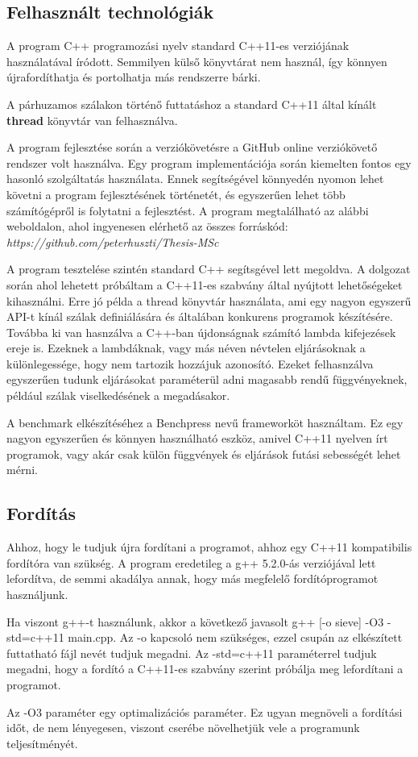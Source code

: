 \documentclass[twoside, a4paper, 12pt]{article}
\begin{document}
\subsection{Felhasznált technológiák}
A program C++ programozási nyelv standard C++11-es verziójának használatával íródott. Semmilyen külső könyvtárat nem használ, így könnyen újrafordíthatja és portolhatja más rendszerre bárki. \par
A párhuzamos szálakon történő futtatáshoz a standard C++11 által kínált \textbf{thread} könyvtár van felhasználva. \par
A program fejlesztése során a verziókövetésre a GitHub online verziókövető rendszer volt használva. Egy program implementációja során kiemelten fontos egy hasonló szolgáltatás használata. Ennek segítségével könnyedén nyomon lehet követni a program fejlesztésének történetét, és egyszerűen lehet több számítógépről is folytatni a fejlesztést. A program megtalálható az alábbi weboldalon, ahol ingyenesen elérhető az összes forráskód: \textit{https://github.com/peterhuszti/Thesis-MSc} \par
A program tesztelése szintén standard C++ segítsgével lett megoldva. A dolgozat során ahol lehetett próbáltam a C++11-es szabvány által nyújtott lehetőségeket kihasználni. Erre jó példa a thread könyvtár használata, ami egy nagyon egyszerű API-t kínál szálak definiálására és általában konkurens programok készítésére. Továbba ki van hasnzálva a C++-ban újdonságnak számító lambda kifejezések ereje is. Ezeknek a lambdáknak, vagy más néven névtelen eljárásoknak a különlegessége, hogy nem tartozik hozzájuk azonosító. Ezeket felhasnzálva egyszerűen tudunk eljárásokat paraméterül adni magasabb rendű függvényeknek, például szálak viselkedésének a megadásakor. \par
A benchmark elkészítéséhez a Benchpress nevű frameworköt használtam. Ez egy nagyon egyszerűen és könnyen használható eszköz, amivel C++11 nyelven írt programok, vagy akár csak külön függvények és eljárások futási sebességét lehet mérni. \par \cite{benchpress}

\subsection{Fordítás} \cite{gccpar}

Ahhoz, hogy le tudjuk újra fordítani a programot, ahhoz egy C++11 kompatibilis fordítóra van szükség. A program eredetileg a g++ 5.2.0-ás verziójával lett lefordítva, de semmi akadálya annak, hogy más megfelelő fordítóprogramot használjunk. \par
Ha viszont g++-t használunk, akkor a következő javasolt g++ [-o sieve] -O3 -std=c++11 main.cpp. Az -o kapcsoló nem szükséges, ezzel csupán az elkészített futtatható fájl nevét tudjuk megadni. Az -std=c++11 paraméterrel tudjuk megadni, hogy a fordító a C++11-es szabvány szerint próbálja meg lefordítani a programot.  \par 
Az -O3 paraméter egy optimalizációs paraméter. Ez ugyan megnöveli a fordítási időt, de nem lényegesen, viszont cserébe növelhetjük vele a programunk teljesítményét.
\end{document}
